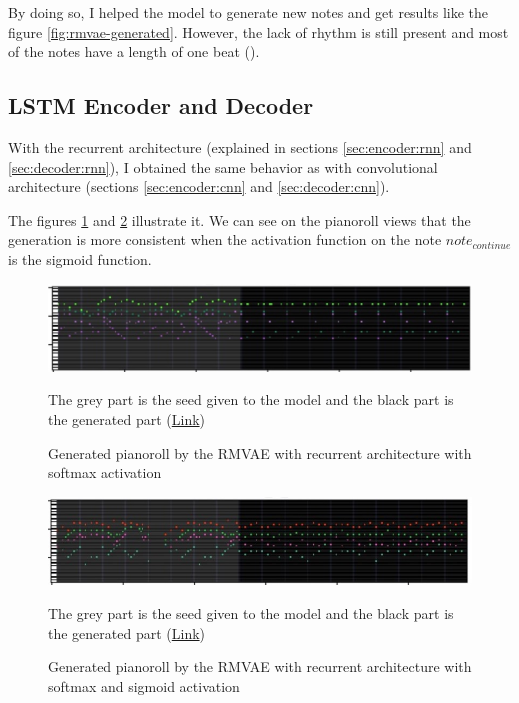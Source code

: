 \documentclass[12pt]{report}
\begin{document}
By doing so, I helped the model to generate new notes and get results like the figure \ref{fig:rmvae-generated}.
However, the lack of rhythm is still present and most of the notes have a length of one beat (\musQuarter).


\subsection{LSTM Encoder and Decoder}

With the recurrent architecture (explained in sections \ref{sec:encoder:rnn} and \ref{sec:decoder:rnn}), I obtained the same behavior as with convolutional architecture (sections \ref{sec:encoder:cnn} and \ref{sec:decoder:cnn}).

The figures \ref{fig:pianoroll:rrmvae:no-binary} and \ref{fig:pianoroll:rrmvae:with-binary} illustrate it.
We can see on the pianoroll views that the generation is more consistent when the activation function on the note $note_{continue}$ is the sigmoid function.

\begin{figure}[htbp]
    \centering
    \includegraphics[width=\textwidth]{images/generated_midis/RRMVAE/pianoroll-rrmvae-no-binary.jpg}
    \caption{Generated pianoroll by the RMVAE with recurrent architecture with softmax activation}
    The grey part is the seed given to the model and the black part is the generated part
    (\href{https://github.com/ValentinVignal/midiGenerator/blob/master/samples/results/lstm_encoder_decoder.mid}{Link})
    \label{fig:pianoroll:rrmvae:no-binary}
\end{figure}

\begin{figure}[htbp]
    \centering
    \includegraphics[width=\textwidth]{images/generated_midis/RRMVAE/pianoroll-rrmvae-with-binary.jpg}
    \caption{Generated pianoroll by the RMVAE with recurrent architecture with softmax and sigmoid activation}
    The grey part is the seed given to the model and the black part is the generated part
    (\href{https://github.com/ValentinVignal/midiGenerator/blob/master/samples/results/rrmvae-with-binary.mid}{Link})
    \label{fig:pianoroll:rrmvae:with-binary}
\end{figure}
\end{document}
